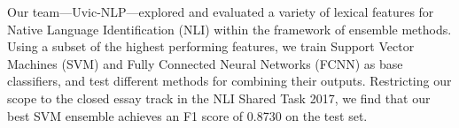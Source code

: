 Our team—Uvic-NLP—explored and evaluated a variety of lexical features for Native Language Identification (NLI) within the framework of ensemble methods. Using a subset of the highest performing features, we train Support Vector Machines (SVM) and Fully Connected Neural Networks (FCNN) as base classifiers, and test different methods for combining their outputs. Restricting our scope to the closed essay track in the NLI Shared Task 2017, we find that our best SVM ensemble achieves an F1 score of 0.8730 on the test set.
